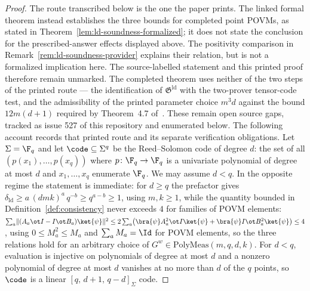 \begin{proof}
	The route transcribed below is the one the paper prints. The linked
	formal theorem instead establishes the three bounds for completed point
	POVMs, as stated in Theorem~\ref{lem:ld-soundness-formalized}; it does not
	state the conclusion for the prescribed-answer effects displayed above.
	The positivity comparison in Remark~\ref{rem:ld-soundness-provider}
	explains their relation, but is not a formalized implication here.
	The source-labelled statement and this printed proof therefore remain
	unmarked. The completed theorem uses neither of the two steps of the
	printed route --- the identification of $\mathfrak{G}^{\mathrm{ld}}$ with the
	two-prover tensor-code test, and the admissibility of the printed parameter
	choice $m^3 d$ against the bound $12m(d+1)$ required by Theorem~4.7
	of~\cite{Ji2021Quantum}. These remain open source gaps, tracked as issue
	527 of this repository and enumerated below. The following account records
	that printed route and its separate verification obligations.
	Let $\Sigma = \F_q$ and let $\code \subseteq \Sigma^q$ be the Reed--Solomon code of degree $d$: the set of all $(p(x_1),\ldots,p(x_q))$ where $p\colon \F_q \to \F_q$ is a univariate polynomial of degree at most $d$ and $x_1,\ldots,x_q$ enumerate $\F_q$. We may assume $d < q$. In the opposite regime the statement is immediate: for $d \ge q$ the prefactor gives $\delta_{\mathrm{ld}} \ge a\,(dmk)^a\, q^{-b} \ge q^{a-b} \ge 1$, using $m, k \ge 1$, while the quantity bounded in Definition~\ref{def:consistency} never exceeds $4$ for families of POVM elements: $\sum_a \lVert (A_a \ot I - I \ot B_a)\ket{\psi}\rVert^2 \le 2\sum_a \bigl(\bra{\psi} A_a^2 \ot I \ket{\psi} + \bra{\psi} I \ot B_a^2 \ket{\psi}\bigr) \le 4$, using $0 \le M_a^2 \le M_a$ and $\sum_a M_a = \Id$ for POVM elements, so the three relations hold for an arbitrary choice of $G^w \in \mathrm{PolyMeas}(m,q,d,k)$. For $d < q$, evaluation is injective on polynomials of degree at most $d$ and a nonzero polynomial of degree at most $d$ vanishes at no more than $d$ of the $q$ points, so $\code$ is a linear $[q,\, d+1,\, q-d]_\Sigma$ code.

\end{proof}
